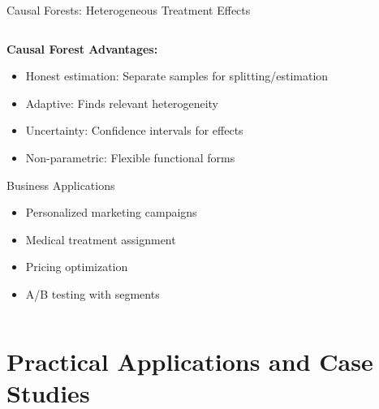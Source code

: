 \documentclass[aspectratio=169,11pt]{beamer}
\begin{document}
\begin{frame}[fragile]{Causal Forests: Heterogeneous Treatment Effects}
\begin{columns}
\begin{column}{0.45\textwidth}
\vspace{0.3cm}
\textbf{Causal Forest Advantages:}
\begin{itemize}
\item \textcolor{forest}{Honest estimation}: Separate samples for splitting/estimation
\item \textcolor{forest}{Adaptive}: Finds relevant heterogeneity
\item \textcolor{forest}{Uncertainty}: Confidence intervals for effects
\item \textcolor{forest}{Non-parametric}: Flexible functional forms
\end{itemize}

\begin{alertblock}{Business Applications}
\begin{itemize}
\item Personalized marketing campaigns
\item Medical treatment assignment
\item Pricing optimization
\item A/B testing with segments
\end{itemize}
\end{alertblock}
\end{column}
\end{columns}
\end{frame}

\section{Practical Applications and Case Studies}
\end{document}
